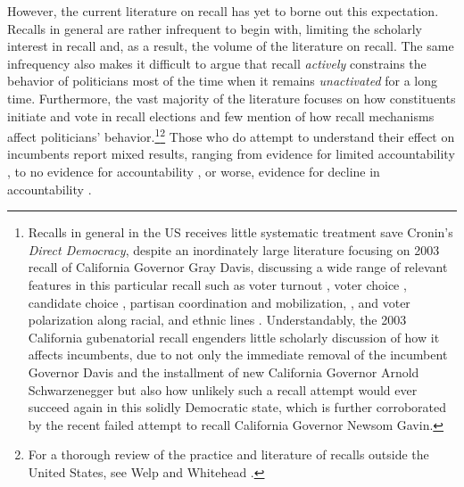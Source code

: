 \documentclass{article}
\begin{document}
		However, the current literature on recall has yet to borne out this expectation.
		Recalls in general are rather infrequent to begin with,
		limiting the scholarly interest in recall and, as a result, the volume of the literature on recall.
		The same infrequency also makes it difficult to argue 
		that recall
		\textit
		{actively}
		constrains 
		the
		behavior of politicians 
		most of the time when it remains \textit{unactivated} for a long time.
		Furthermore, the vast majority of the literature focuses on how 
		constituents initiate and vote in recall elections and 
		few mention of how recall mechanisms affect politicians' behavior.\footnote
		{
			Recalls in general in the US receives little systematic treatment save Cronin's
			\autocite*{croninDirectDemocracyPolitics1989}
			\textit{Direct Democracy}, despite an inordinately large literature focusing on 2003 recall of California Governor Gray Davis, 
			discussing a wide range of relevant features in this particular recall such as 
			voter turnout
			\autocite{arbourVoterTurnoutCalifornia2005},
			voter choice 
			\autocite{alvarezRationalityRationalisticChoice2009,shawStrategicVotingCalifornia2005},
			candidate choice
			\autocite{mcgheeRoleCandidateChoice2009},
			partisan coordination and mobilization,
			\autocite{masketCaliforniaRecallSprint2016},
			and
			voter polarization along
			racial, and ethnic
			lines
			\autocite{seguraRaceRecallRacial2008}.
			Understandably, the 2003 California gubenatorial recall engenders little scholarly
			discussion of how it affects incumbents, 
			due to not only the immediate removal of the incumbent Governor Davis and 
			the
			installment of new California Governor Arnold Schwarzenegger
			but also 
			how unlikely such a recall attempt
			would ever succeed again in this solidly Democratic state,
			which is further corroborated by the recent failed attempt to recall California Governor Newsom Gavin.
		}\footnote
		{
			For a thorough review of the practice and literature of recalls outside the United States,
			see Welp and Whitehead \autocite*{welpPoliticsRecallElections2020}.
		}
		Those who do attempt to understand their effect on incumbents report mixed results, 
		ranging from evidence for limited accountability
		\autocite{okamotoRecallJapanMeasure2020},
		to
		no evidence for accountability
		\autocite{welpRecallReferendumsPeruvian2016},
		or worse,
		evidence for decline in accountability
		\autocite{hamanRecallElectionsTool2021}.
		
\end{document}
